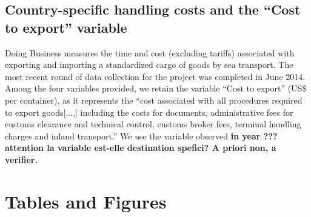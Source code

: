 \documentclass[a4paper,11pt]{article}
\begin{document}
\subsection{Country-specific handling costs and the ``Cost to export'' variable}


Doing Business measures the time and cost (excluding tariffs) associated with exporting and importing a standardized cargo of goods by sea transport. The most recent round of data collection for the project was completed in June 2014. Among the four variables provided, we retain the variable ``Cost to export'' (US\$ per container), as it represents the ``cost associated with all procedures required to export goods[...,] including the costs for documents, administrative fees for customs clearance and technical control, customs broker fees, terminal handling charges and inland transport.'' We use the variable observed \textbf{in year ??? attention la variable est-elle destination spefici? A priori non, a verifier.}
\newpage


\section*{Tables and Figures}


\end{document}
